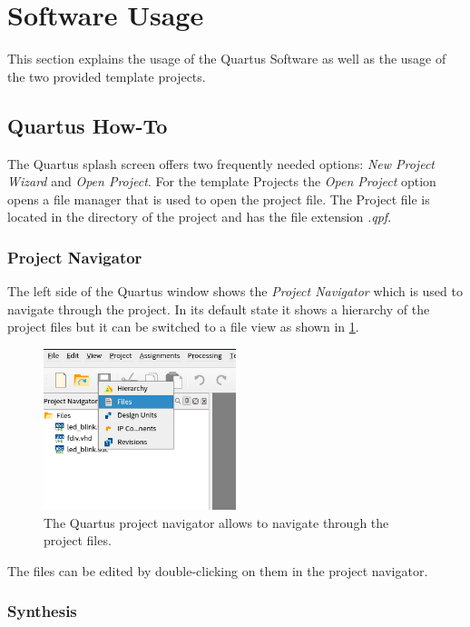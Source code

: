 \section{Software Usage}

This section explains the usage of the Quartus Software as well as the usage of the two provided template projects.

\subsection{Quartus How-To}

The Quartus splash screen offers two frequently needed options: \textit{New Project Wizard} and \textit{Open Project}. For the template Projects the \textit{Open Project} option opens a file manager that is used to open the project file. The Project file is located in the directory of the project and has the file extension \textit{.qpf}.

\subsubsection{Project Navigator}

The left side of the Quartus window shows the \textit{Project Navigator} which is used to navigate through the project. In its default state it shows a hierarchy of the project files but it can be switched to a file view as shown in \cref{fig:quartus_project_navigator}.

\begin{figure}[h!]
	\centering
	\includegraphics[width=0.5\textwidth]{fig/quartus_project_navigator.png}
	\caption{The Quartus project navigator allows to navigate through the project files.}
	\label{fig:quartus_project_navigator}
\end{figure}

The files can be edited by double-clicking on them in the project navigator.

\subsubsection{Synthesis}

